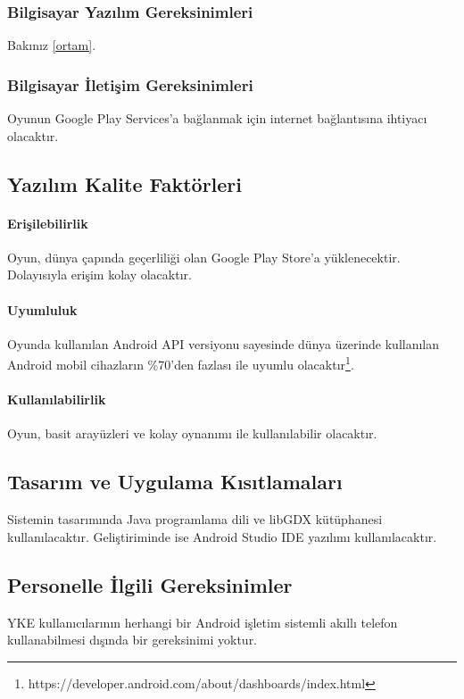 \documentclass[12pt,a4paper]{article}
\begin{document}
   \subsubsection{Bilgisayar Yazılım Gereksinimleri}
   Bakınız \ref{ortam}.
   
   \subsubsection{Bilgisayar İletişim Gereksinimleri}
   Oyunun Google Play Services'a bağlanmak için internet bağlantısına ihtiyacı olacaktır.

   \subsection{Yazılım Kalite Faktörleri}
   \paragraph{Erişilebilirlik}
   Oyun, dünya çapında geçerliliği olan Google Play Store'a yüklenecektir. Dolayısıyla erişim kolay olacaktır.
   \paragraph{Uyumluluk}
   Oyunda kullanılan Android API versiyonu sayesinde dünya üzerinde kullanılan Android mobil cihazların \%70'den fazlası ile uyumlu olacaktır\footnote{https://developer.android.com/about/dashboards/index.html}.
   \paragraph{Kullanılabilirlik}
   Oyun, basit arayüzleri ve kolay oynanımı ile kullanılabilir olacaktır.

   \subsection{Tasarım ve Uygulama Kısıtlamaları}
   Sistemin tasarımında Java programlama dili ve libGDX kütüphanesi kullanılacaktır. Geliştiriminde ise Android Studio IDE yazılımı kullanılacaktır.

   \subsection{Personelle İlgili Gereksinimler}
   YKE kullanıcılarının herhangi bir Android işletim sistemli akıllı telefon kullanabilmesi dışında bir gereksinimi yoktur.
\end{document}
